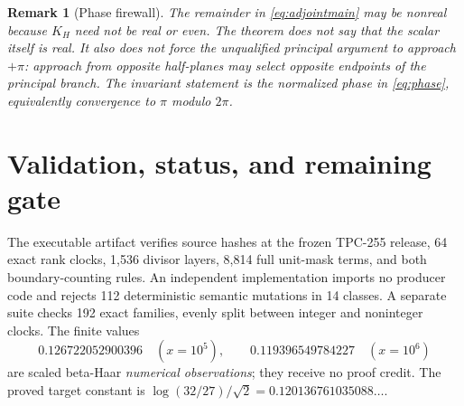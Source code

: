 \documentclass[10pt]{article}
\newtheorem{remark}[theorem]{Remark}
\begin{document}
\begin{remark}[Phase firewall]
The remainder in \eqref{eq:adjointmain} may be nonreal because $K_H$ need not
be real or even.  The theorem does not say that the scalar itself is real.
It also does not force the unqualified principal argument to approach
$+\pi$: approach from opposite half-planes may select opposite endpoints of
the principal branch.  The invariant statement is the normalized phase in
\eqref{eq:phase}, equivalently convergence to $\pi$ modulo $2\pi$.
\end{remark}

\section{Validation, status, and remaining gate}

The executable artifact verifies source hashes at the frozen TPC-255 release,
64 exact rank clocks, 1,536 divisor layers, 8,814 full unit-mask terms, and
both boundary-counting rules.  An independent implementation imports no
producer code and rejects 112 deterministic semantic mutations in 14
classes.  A separate suite checks 192 exact families, evenly split between
integer and noninteger clocks.  The finite values
\[
 0.126722052900396\quad(x=10^5),\qquad
 0.119396549784227\quad(x=10^6)
\]
are scaled beta-Haar \emph{numerical observations}; they receive no proof
credit.  The proved target constant is
$\log(32/27)/\sqrt2=0.120136761035088\ldots$.
\end{document}
